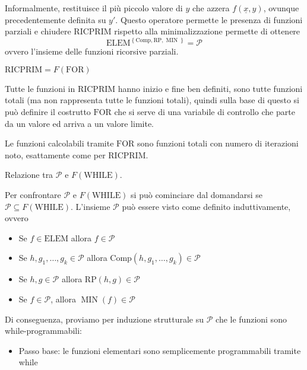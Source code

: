 \documentclass[12pt, answers]{exam}
\theoremstyle{plain}
\DeclareMathOperator{\MIN}{MIN}
\newcommand{\while}{\text{WHILE}}
\newcommand{\for}{\text{FOR}}
\newcommand{\elem}{\text{ELEM}}
\newcommand{\comp}{\text{Comp}}
\newcommand{\rp}{\text{RP}}
\newcommand{\ricprim}{\text{RICPRIM}}
\newcommand{\cp}{\mathcal{P}}
\begin{document}
\begin{questions}
\begin{solution}
            Informalmente, restituisce il più piccolo valore di $y$ che azzera $f(\underline x, y)$, ovunque precedentemente definita su $y'$. Questo operatore permette le presenza di funzioni parziali e chiudere $\ricprim$ rispetto alla minimalizzazione permette di ottenere
            $$ \elem^{\left\{\comp, \rp, \MIN\right\}} = \cp $$
            ovvero l'insieme delle funzioni ricorsive parziali.
        \end{solution}
        
        \question $\ricprim = F(\for)$
        
        \begin{solution}
            Tutte le funzioni in $\ricprim$ hanno inizio e fine ben definiti, sono tutte funzioni totali (ma non rappresenta tutte le funzioni totali), quindi sulla base di questo si può definire il costrutto $\for$ che si serve di una variabile di controllo che parte da un valore ed arriva a un valore limite. 
            
            Le funzioni calcolabili tramite $\for$ sono funzioni totali con numero di iterazioni noto, esattamente come per $\ricprim$.
        \end{solution}
        
        \question Relazione tra $\cp$ e $F(\while)$.
        
        \begin{solution}
            Per confrontare $\cp$ e $F(\while)$ si può cominciare dal domandarsi se $\cp \subseteq F(\while)$. L'insieme $\cp$ può essere visto come definito induttivamente, ovvero
            \begin{itemize}
                \item Se $f \in \elem$ allora $f \in \cp$
                
                \item Se $h, g_1, \dots, g_k \in \cp$ allora $\comp(h, g_1, \dots, g_k) \in \cp$
                
                \item Se $h, g \in \cp$ allora $\rp(h,g) \in \cp$ 
                
                \item Se $f \in \cp$, allora $\MIN (f) \in \cp$
            \end{itemize}
            
             Di conseguenza, proviamo per induzione strutturale su $\cp$ che le funzioni sono while-programmabili: 
            \begin{itemize}
                \item Passo base: le funzioni elementari sono semplicemente programmabili tramite while
                

\end{itemize}
\end{solution}
\end{questions}
\end{document}
